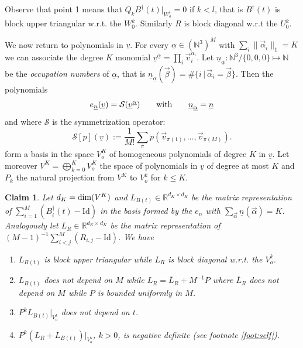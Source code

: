 \documentclass{article}
\newcommand*\R{ \mathds{R} }
\newcommand*\N{ \mathds{N} }
\newcommand\uv{{\underline v}}
\newcommand\vv{{\vec v}}
\newtheorem{myclaim}{Claim}
\begin{document}
Observe that point 1 means that $Q_k B^\dagger(t)\big|_{W^l_o}=0$ if $k<l$, that is $B^\dagger(t)$ is block upper 
triangular w.r.t. the $W^k_0$. Similarly $R$ is block diagonal w.r.t the $U^k_0$.

We now return to polynomials in $\uv$. For every $\underline \alpha\in (\N^3)^M$ with $\sum_i \|\vec \alpha_i\|_1=K$ we 
can associate the degree $K$ monomial $\uv^{\underline \alpha}=\prod_i \vv_i^{\alpha_i}$. Let $\underline n_{\underline 
\alpha}:\N^3/\{0,0,0\}\mapsto \N$ be the {\it occupation numbers} of $\underline \alpha$, that is $\underline 
n_{\underline 
\alpha}(\vec\beta)=\#\{i\,|\, \vec \alpha_i=\vec \beta\}$. Then the polynomials
\[
e_{\underline n}(\uv)=\mathcal S(\uv^{\underline \alpha})\qquad\hbox{with}\qquad \underline n_{\underline 
\alpha}=\underline n
\]
and where $\mathcal S$ is the symmetrization operator:
\[
\mathcal S[p](\uv):=\frac 1{M!}\sum_\pi p(\vv_{\pi(1)},\ldots,\vv_{\pi(M)}).
\]
form a basis in the space $V^K_o$ of homogeneous polynomials of degree $K$ in $\uv$. Let moreover $V^K=\bigoplus_{k=0}^K
V_o^K$ the space of polynomials in $\uv$ of degree at most $K$ and $P_k$ the natural projection from $V^K$ to $V^k_o$
for $k\leq K$.

\begin{myclaim}\label{claim:1} Let $d_K={\rm dim}(V^K)$ and $L_{B(t)}\in \R^{d_K\times d_K}$ be the matrix 
representation of 
$\sum_{i=1}^M (B_i^\dagger(t)-\mathrm{Id})$ in the basis formed by the $e_{\underline n}$ with $\sum_{\vec 
\alpha}\underline n(\vec \alpha)=K$. 
Analogously let $L_R\in\R^{d_K\times d_K}$ be the matrix representation of  $(M-1)^{-1}\sum _{i<j}^M 
(R_{i,j}-\mathrm{Id})$. We have

\begin{enumerate}
\item $L_{B(t)}$ is block upper triangular while $L_R$ is block diagonal w.r.t. the $V^k_o$.
\item $L_{B(t)}$ does not depend on $M$ while $L_R=\overline L_R+ M^{-1} P$ where $\overline L_R$ does not depend on 
$M$ while $P$ is bounded uniformly in $M$.
\item $P^{k}L_{B(t)}|_{V^{k}_o}$ does not depend on $t$.
\item $P^{k}(L_R+L_{B(t)})|_{V^{k}_o}$, $k>0$, is negative definite (see footnote \ref{foot:self}).
\end{enumerate}

\end{myclaim}
\end{document}
